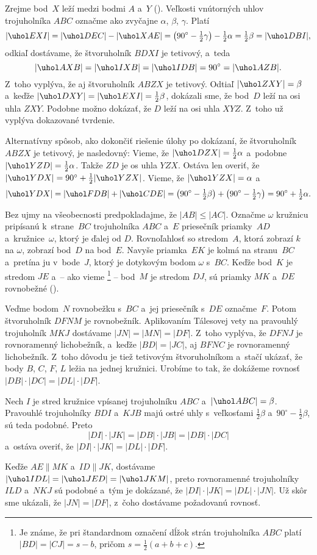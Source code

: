 {%
Zrejme bod~$X$ leží medzi bodmi $A$ a~$Y$ (\obr). Veľkosti vnútorných uhlov trojuholníka $ABC$ označme ako zvyčajne $\alpha$, $\beta$, $\gamma$. Platí
$$
|\uhol EXI|=|\uhol DEC|-|\uhol XAE|=\left(90^\circ-\tfrac12{\gamma}\right)-\tfrac12{\alpha}=\tfrac12{\beta}=|\uhol DBI|,
$$
odkiaľ dostávame, že štvoruholník $BDXI$ je tetivový, a~teda
$$
|\uhol AXB|=|\uhol IXB|=|\uhol IDB|= 90^\circ=|\uhol AZB|.
$$
Z~toho vyplýva, že aj štvoruholník $ABZX$ je tetivový. Odtiaľ $|\uhol ZXY|=\beta$ a~keďže $|\uhol DXY|=|\uhol EXI|=\frac12\beta$, dokázali sme, že bod~$D$ leží na osi uhla $ZXY$. Podobne možno dokázať, že $D$ leží na osi uhla $XYZ$. Z~toho už vyplýva dokazované tvrdenie.
%

\poznamka
Alternatívny spôsob, ako dokončiť riešenie úlohy po dokázaní, že štvoruholník $ABZX$ je tetivový, je nasledovný: Vieme, že $|\uhol DZX|=\frac12{\alpha}$ a~podobne $|\uhol YZD|=\frac12{\alpha}$. Takže $ZD$ je os uhla $YZX$. Ostáva len overiť, že $|\uhol YDX|=90^\circ+\frac{1}{2}|\uhol YZX|$. Vieme, že $|\uhol YZX|=\alpha$ a
$$
|\uhol YDX|=|\uhol FDB|+|\uhol CDE|=\left(90^\circ-\tfrac12{\beta}\right)+\left(90^\circ-\tfrac12{\gamma}\right)=90^\circ+\tfrac12{\alpha}.
$$}

{%
Bez ujmy na všeobecnosti predpokladajme, že $|AB|\le|AC|$. Označme $\omega$ kružnicu pripísanú k~strane~$BC$ trojuholníka $ABC$ a~$E$ priesečník priamky~$AD$ a~kružnice~$\omega$, ktorý je ďalej od $D$. Rovnoľahlosť so stredom~$A$, ktorá zobrazí $k$ na $\omega$, zobrazí bod~$D$ na bod~$E$. Navyše priamka~$EK$ je kolmá na stranu~$BC$ a~pretína ju v~bode~$J$, ktorý je dotykovým bodom $\omega$ s~$BC$. Keďže bod~$K$ je stredom $JE$ a~-- ako vieme \footnote{Je známe, že pri štandardnom označení dĺžok strán trojuholníka $ABC$ platí $|BD|=|CJ|=s-b$, pričom $s=\frac12(a+b+c)$.} -- bod~$M$ je stredom $DJ$, sú priamky $MK$ a~$DE$ rovnobežné (\obr).
%

Veďme bodom~$N$ rovnobežku s~$BC$ a~jej priesečník s~$DE$ označme~$F$. Potom štvoruholník $DFNM$ je rovnobežník. Aplikovaním Tálesovej vety na pravouhlý trojuholník $MKJ$ dostávame $|JN|=|MN|=|DF|$. Z~toho vyplýva, že $DFNJ$ je rovnoramenný lichobežník, a~keďže $|BD|=|JC|$, aj $BFNC$ je rovnoramenný lichobežník. Z~toho dôvodu je tiež tetivovým štvoruholníkom a~stačí ukázať, že body $B$, $C$, $F$, $L$ ležia na jednej kružnici. Urobíme to tak, že dokážeme rovnosť $|DB| \cdot |DC| = {|DL| \cdot |DF|}$.

Nech $I$ je stred kružnice vpísanej trojuholníku $ABC$ a~$|\uhol ABC|=\beta$. Pravouhlé trojuholníky $BDI$ a~$KJB$ majú ostré uhly s~veľkosťami $\frac12\beta$ a~$90^\circ-\frac12\beta$, sú teda podobné. Preto
$$
|DI| \cdot |JK| = |DB| \cdot |JB| = |DB| \cdot |DC|
$$
a~ostáva overiť, že $|DI| \cdot |JK| = |DL| \cdot |DF|$.

Keďže $AE\parallel MK$ a~$ID\parallel JK$, dostávame $|\uhol IDL|=|\uhol JED|=|\uhol JKM|$, preto rovnoramenné trojuholníky $ILD$ a~$NKJ$ sú podobné a~tým je dokázané, že  $|DI|\cdot |JK| =|DL|\cdot |JN|$. Už skôr sme ukázali, že $|JN|=|DF|$, z~čoho dostávame požadovanú rovnosť.
}

